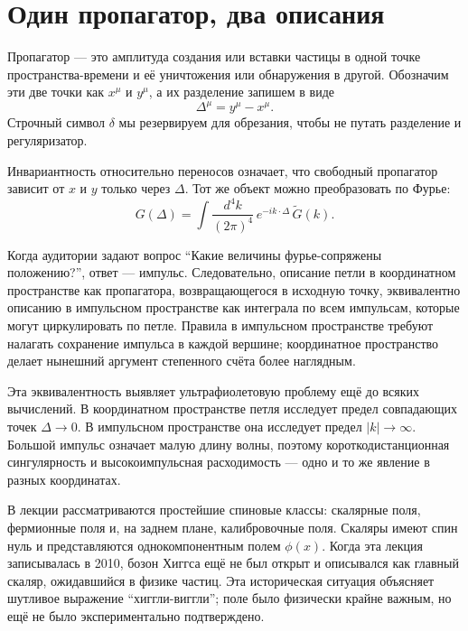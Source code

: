 \section{Один пропагатор, два описания}

Пропагатор — это амплитуда создания или вставки частицы в одной точке пространства-времени и её уничтожения или обнаружения в другой. Обозначим эти две точки как \(x^\mu\) и \(y^\mu\), а их разделение запишем в виде
\begin{equation}
\Delta^\mu=y^\mu-x^\mu.
\end{equation}
Строчный символ \(\delta\) мы резервируем для обрезания, чтобы не путать разделение и регуляризатор.

Инвариантность относительно переносов означает, что свободный пропагатор зависит от \(x\) и \(y\) только через \(\Delta\). Тот же объект можно преобразовать по Фурье:
\begin{equation}
G(\Delta)
=\int\frac{d^4k}{(2\pi)^4}\,e^{-ik\cdot\Delta}\,\widetilde G(k).
\end{equation}

Когда аудитории задают вопрос ``Какие величины фурье-сопряжены положению?'', ответ — импульс. Следовательно, описание петли в координатном пространстве как пропагатора, возвращающегося в исходную точку, эквивалентно описанию в импульсном пространстве как интеграла по всем импульсам, которые могут циркулировать по петле. Правила в импульсном пространстве требуют налагать сохранение импульса в каждой вершине; координатное пространство делает нынешний аргумент степенного счёта более наглядным.

Эта эквивалентность выявляет ультрафиолетовую проблему ещё до всяких вычислений. В координатном пространстве петля исследует предел совпадающих точек \(\Delta\to0\). В импульсном пространстве она исследует предел \(|k|\to\infty\). Большой импульс означает малую длину волны, поэтому короткодистанционная сингулярность и высокоимпульсная расходимость — одно и то же явление в разных координатах.

В лекции рассматриваются простейшие спиновые классы: скалярные поля, фермионные поля и, на заднем плане, калибровочные поля. Скаляры имеют спин нуль и представляются однокомпонентным полем \(\phi(x)\). Когда эта лекция записывалась в 2010, бозон Хиггса ещё не был открыт и описывался как главный скаляр, ожидавшийся в физике частиц. Эта историческая ситуация объясняет шутливое выражение ``хиггли-виггли''; поле было физически крайне важным, но ещё не было экспериментально подтверждено.

